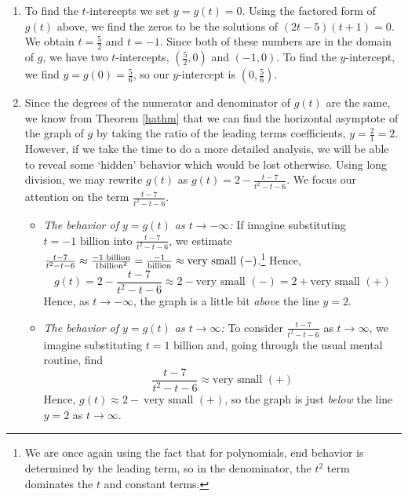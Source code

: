\documentclass{ximera}
\begin{document}
\begin{ex}
\begin{enumerate}
\item  To find the $t$-intercepts  we set $y = g(t) = 0$.  Using the factored form of $g(t)$ above, we find the zeros to be the solutions of $(2t-5)(t+1)=0$.  We obtain $t = \frac{5}{2}$ and $t=-1$. Since both of these numbers are in the domain of $g$, we have two $t$-intercepts, $\left( \frac{5}{2},0\right)$ and $(-1,0)$.  To find the $y$-intercept, we find $y = g(0) = \frac{5}{6}$, so our $y$-intercept is $\left(0, \frac{5}{6}\right)$.

\item  Since the degrees of the numerator and denominator of $g(t)$ are the same, we know from Theorem \ref{hathm} that we can find the horizontal asymptote of the graph of $g$ by taking the ratio of the leading terms coefficients, $y = \frac{2}{1} = 2$.  However, if we take the time to do a more detailed analysis, we will be able to reveal some `hidden' behavior which would be lost otherwise.  Using long division, we may rewrite $g(t)$ as $g(t) = 2 - \frac{t-7}{t^2-t-6}.$  We focus our attention on the term $\frac{t-7}{t^2-t-6}$.  

\begin{itemize}

\item  \textit{The behavior of $y=g(t)$ as $t \rightarrow -\infty$:} If imagine substituting $t = \text{$-1$ billion}$ into $\frac{t-7}{t^2-t-6}$, we estimate $\frac{t-7}{t^2-t-6} \approx \frac{\text{\scriptsize $-1$ billion}}{1 \text{\scriptsize billion}^2}  = \frac{-1}{\text{\scriptsize billion}} \approx \text{very small $(-)$}$.\footnote{We are once again using the fact that for polynomials, end behavior is determined by the leading term, so in the denominator, the $t^2$ term dominates the $t$ and constant terms.}  Hence, \[g(t) =  2 - \frac{t-7}{t^2-t-6} \approx 2 - \text{very small $(-)$} = 2 + \text{very small $(+)$}\]  Hence, as $t \rightarrow -\infty$, the graph is a little bit \textit{above} the line $y=2$.

\item  \textit{The behavior of $y=g(t)$ as $t \rightarrow \infty$:}  To consider $\frac{t-7}{t^2-t-6}$ as $t \rightarrow \infty$, we imagine substituting $t= \text{$1$ billion}$ and, going through the usual mental routine, find \[\frac{t-7}{t^2-t-6} \approx \text{very small $(+)$}\]  Hence, $g(t) \approx 2 - \ \text{very small $(+)$}$, so the graph is just \textit{below} the line $y=2$ as $t \rightarrow \infty$.

\end{itemize}


\end{enumerate}
\end{ex}
\end{document}
